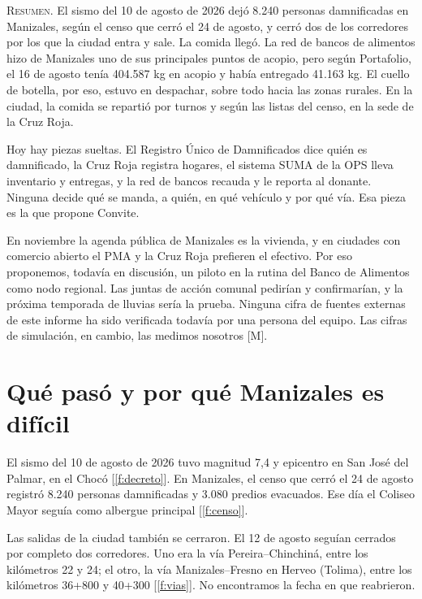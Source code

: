 \documentclass[11pt,letterpaper,parskip=half-]{scrartcl}
\newcommand{\marca}[1]{\textcolor{ceniza}{\footnotesize[#1]}}   %
\newcommand{\cf}[1]{\textcolor{tinta}{[\ref{#1}]}}                %
\begin{document}
\begin{resumen}
\textsc{\color{tinta}Resumen.} El sismo del 10 de agosto de 2026 dejó 8.240 personas damnificadas en Manizales, según el censo que cerró el 24 de agosto, y cerró dos de los corredores por los que la ciudad entra y sale. La comida llegó. La red de bancos de alimentos hizo de Manizales uno de sus principales puntos de acopio, pero según Portafolio, el 16 de agosto tenía 404.587 kg en acopio y había entregado 41.163 kg. El cuello de botella, por eso, estuvo en despachar, sobre todo hacia las zonas rurales. En la ciudad, la comida se repartió por turnos y según las listas del censo, en la sede de la Cruz Roja.

Hoy hay piezas sueltas. El Registro Único de Damnificados dice quién es damnificado, la Cruz Roja registra hogares, el sistema SUMA de la OPS lleva inventario y entregas, y la red de bancos recauda y le reporta al donante. Ninguna decide qué se manda, a quién, en qué vehículo y por qué vía. Esa pieza es la que propone Convite.

En noviembre la agenda pública de Manizales es la vivienda, y en ciudades con comercio abierto el PMA y la Cruz Roja prefieren el efectivo. Por eso proponemos, todavía en discusión, un piloto en la rutina del Banco de Alimentos como nodo regional. Las juntas de acción comunal pedirían y confirmarían, y la próxima temporada de lluvias sería la prueba. Ninguna cifra de fuentes externas de este informe ha sido verificada todavía por una persona del equipo. Las cifras de simulación, en cambio, las medimos nosotros \marca{M}.
\end{resumen}

\section{Qué pasó y por qué Manizales es difícil}

El sismo del 10 de agosto de 2026 tuvo magnitud 7,4 y epicentro en San José del Palmar, en el Chocó \cf{f:decreto}. En Manizales, el censo que cerró el 24 de agosto registró 8.240 personas damnificadas y 3.080 predios evacuados. Ese día el Coliseo Mayor seguía como albergue principal \cf{f:censo}.

Las salidas de la ciudad también se cerraron. El 12 de agosto seguían cerrados por completo dos corredores. Uno era la vía Pereira–Chinchiná, entre los kilómetros 22 y 24; el otro, la vía Manizales–Fresno en Herveo (Tolima), entre los kilómetros 36+800 y 40+300 \cf{f:vias}. No encontramos la fecha en que reabrieron.
\end{document}
